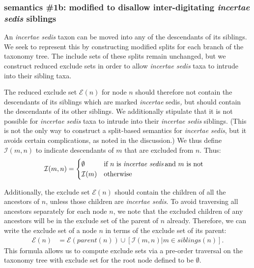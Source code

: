 \documentclass[english]{article}
\begin{document}
\subsubsection{semantics \#1b: modified to disallow inter-digitating
\emph{incertae sedis} siblings}

An \emph{incertae sedis} taxon can be moved into any of the
descendants of its siblings.
We seek to represent this by constructing
modified splits for each branch of the taxonomy tree.
The include sets
of these splits remain unchanged, but we construct reduced exclude
sets in order to allow \emph{incertae sedis} taxa to intrude into
their sibling taxa.

The reduced exclude set $\mathcal{E}(n)$ for node $n$ should therefore
not contain the descendants of its siblings which are marked
\emph{incertae }sedis\emph{,} but should contain the descendants of
its other siblings\emph{.
}We additionally stipulate that it is not
possible for \emph{incertae sedis} taxa to intrude into their
\emph{incertae sedis} siblings.
(This is not the only way to construct
a split-based semantics for \emph{incertae sedis}, but it avoids
certain complications, as noted in the discussion.) We thus define
$\mathcal{I}(m,n)$ to indicate descendants of $m$ that are excluded
from $n$.
Thus:
\begin{align*}
\mathcal{I}(m,n) & =
    \begin{cases}
        \emptyset & \text{if }n\text{ is \emph{incertae sedis}\,and }m\text{
is not}\\
        \mathcal{I}(m) & \text{otherwise}
    \end{cases}
\end{align*}

Additionally, the exclude set $\mathcal{E}(n)$ should contain the
children of all the ancestors of $n$, unless those children are
\emph{incertae sedis}.
To avoid traversing all ancestors separately
for each node $n$, we note that the excluded children of any ancestors
will be in the exclude set of the parent of $n$ already.
Therefore, we
can write the exclude set of a node $n$ in terms of the exclude set of
its parent:
\begin{align}
    \mathcal{E}(n) & = \mathcal{E}(parent(n))\cup\left[\mathcal{I}(m,n)\big|m\in
           siblings(n)\right].\label{eq:exclude-set-formula-1}
\end{align}
This
formula allows us to compute exclude sets via a pre-order traversal on
the taxonomy tree with exclude set for the root node defined to be
$\emptyset$.
\end{document}
